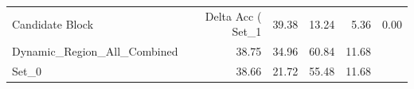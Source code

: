 \begin{tabular}{lrrrr}
\toprule
Candidate Block & Delta Acc (%
\midrule
Set_1 & 39.38 & 13.24 & 5.36 & 0.00 \\
Dynamic_Region_All_Combined & 38.75 & 34.96 & 60.84 & 11.68 \\
Set_0 & 38.66 & 21.72 & 55.48 & 11.68 \\
\bottomrule
\end{tabular}

